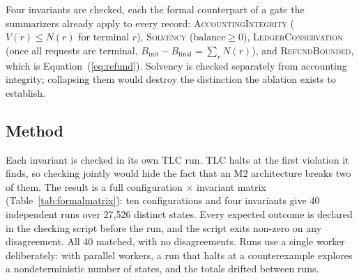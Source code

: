 \documentclass[preprint,3p,authoryear,12pt]{elsarticle}
\begin{document}
Four invariants are checked, each the formal counterpart of a gate the summarizers
already apply to every record: \textsc{AccountingIntegrity} ($V(r) \le N(r)$ for terminal
$r$), \textsc{Solvency} ($\mathrm{balance} \ge 0$), \textsc{LedgerConservation} (once all
requests are terminal, $B_{\mathrm{init}} - B_{\mathrm{final}} = \sum_r N(r)$), and
\textsc{RefundBounded}, which is Equation~(\ref{eq:refund}). Solvency is checked
separately from accounting integrity; collapsing them would destroy the distinction the
ablation exists to establish.

\subsection{Method}
Each invariant is checked in its own TLC run. TLC halts at the first violation it finds,
so checking jointly would hide the fact that an M2 architecture breaks two of them. The
result is a full configuration $\times$ invariant matrix (Table~\ref{tab:formalmatrix}):
ten configurations and four invariants give 40 independent runs over 27{,}526 distinct
states. Every expected outcome is declared in the checking script before the run, and the
script exits non-zero on any disagreement. All 40 matched, with no disagreements. Runs
use a single worker deliberately: with parallel workers, a run that halts at a
counterexample explores a nondeterministic number of states, and the totals drifted
between runs.

\begin{table}[t]
\centering
\caption{TLC model-checking results across ten architecture configurations and four
invariants. All 40 outcomes matched the expectation declared before the run.}
\label{tab:formalmatrix}
\end{table}
\end{document}
